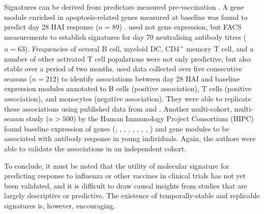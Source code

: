 Signatures can be derived from predictors measured pre-vaccination \autocite{tsang2020ImprovingVaccineinducedImmunity}.
A gene module enriched in apoptosis-related genes measured at baseline was found to predict day 28 \gls{HAI} response ($n=89$) \autocite{furman2013ApoptosisOtherImmune}.
\textcite{tsang2014GlobalAnalysesHuman} used not gene expression, but \gls{FACS} measurements to establish signatures for day 70 neutralising antibody titres ($n=63$).
Frequencies of several B cell, myeloid \gls{DC}, CD4\textsuperscript{+} memory T cell, and a number of other activated T cell populations were not only predictive, but also stable over a period of two months. 
\textcite{nakaya2015SystemsAnalysisImmunity} used data collected over five consecutive seasons ($n=212$) to identify associations between day 28 \gls{HAI} and baseline expression modules annotated to B cells (positive association), T cells (positive association), and monocytes (negative association).
They were able to replicate these associations using published data from \textcite{franco2013IntegrativeGenomicAnalysis} and \textcite{furman2013ApoptosisOtherImmune}.
Another multi-cohort, multi-season study ($n > 500$) by the Human Immunology Project Consortium (HIPC) \autocite{hipc-chisignaturesprojectteam2017MulticohortAnalysisReveals} found baseline expression of genes (, , , , , , , , ) and gene modules to be associated with antibody response in young individuals.
Again, the authors were able to validate the associations in an independent cohort.

To conclude, it must be noted that the utility of molecular signature for predicting response to influenza or other vaccines in clinical trials has not yet been validated,
and it is difficult to draw causal insights from studies that are largely descriptive or predictive.
The existence of temporally-stable and replicable signatures is, however, encouraging.

